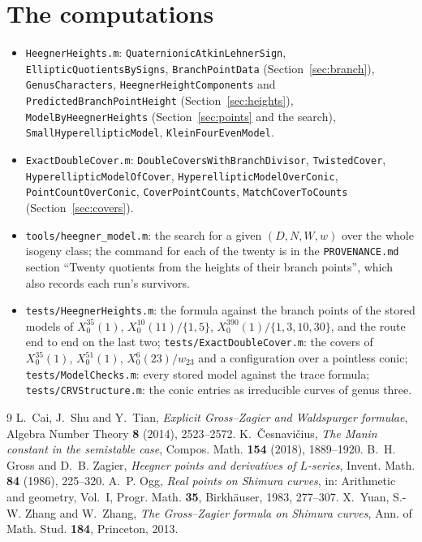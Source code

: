 \documentclass[11pt,reqno]{amsart}
\theoremstyle{plain}
\theoremstyle{definition}
\begin{document}
\section{The computations}\label{sec:computations}

\begin{itemize}
\item \texttt{HeegnerHeights.m}: \texttt{QuaternionicAtkinLehnerSign}, \texttt{EllipticQuotientsBySigns},
  \texttt{BranchPointData} (Section~\ref{sec:branch}), \texttt{GenusCharacters},
  \texttt{HeegnerHeightComponents} and \texttt{PredictedBranchPointHeight} (Section~\ref{sec:heights}),
  \texttt{ModelByHeegnerHeights} (Section~\ref{sec:points} and the search), \texttt{SmallHyperellipticModel},
  \texttt{KleinFourEvenModel}.
\item \texttt{ExactDoubleCover.m}: \texttt{DoubleCoversWithBranchDivisor}, \texttt{TwistedCover},
  \texttt{HyperellipticModelOfCover}, \texttt{HyperellipticModelOverConic}, \texttt{PointCountOverConic},
  \texttt{CoverPointCounts}, \texttt{MatchCoverToCounts} (Section~\ref{sec:covers}).
\item \texttt{tools/heegner\_model.m}: the search for a given $(D,N,W,w)$ over the whole isogeny
  class; the command for each of the twenty is in the \texttt{PROVENANCE.md} section ``Twenty
  quotients from the heights of their branch points'', which also records each run's survivors.
\item \texttt{tests/HeegnerHeights.m}: the formula against the branch points of the stored models
  of $X_0^{35}(1)$, $X_0^{10}(11)/\{1,5\}$, $X_0^{390}(1)/\{1,3,10,30\}$, and the route end to end on
  the last two; \texttt{tests/ExactDoubleCover.m}: the covers of $X_0^{35}(1)$, $X_0^{51}(1)$,
  $X_0^6(23)/w_{23}$ and a configuration over a pointless conic; \texttt{tests/ModelChecks.m}: every
  stored model against the trace formula; \texttt{tests/CRVStructure.m}: the conic entries as
  irreducible curves of genus three.
\end{itemize}

\begin{thebibliography}{9}
 L.~Cai, J.~Shu and Y.~Tian, \emph{Explicit Gross--Zagier and Waldspurger formulae},
Algebra Number Theory \textbf{8} (2014), 2523--2572.
 K.~\v{C}esnavi\v{c}ius, \emph{The Manin constant in the semistable case},
Compos. Math. \textbf{154} (2018), 1889--1920.
 B.~H. Gross and D.~B. Zagier, \emph{Heegner points and derivatives of $L$-series},
Invent. Math. \textbf{84} (1986), 225--320.
 A.~P. Ogg, \emph{Real points on Shimura curves}, in: Arithmetic and geometry, Vol.~I,
Progr. Math. \textbf{35}, Birkh\"auser, 1983, 277--307.
 X.~Yuan, S.-W. Zhang and W.~Zhang, \emph{The Gross--Zagier formula on Shimura curves},
Ann. of Math. Stud. \textbf{184}, Princeton, 2013.
\end{thebibliography}
\end{document}
